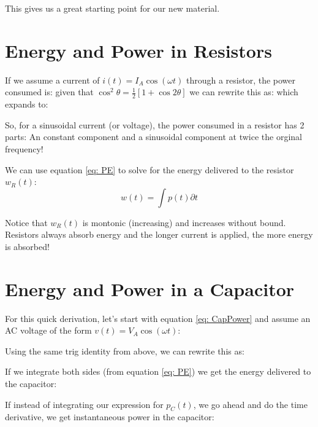 \documentclass{handout}
\begin{document}
This gives us a great starting point for our new material.

\section{Energy and Power in Resistors}
If we assume a current of $i(t)=I_A\cos(\omega t)$ through a resistor, the power consumed is:
\soln{0.75in}{
\[
p_R(t) = I_A^2R\cos^2(\omega t)
\]
}
given that $\cos^2\theta = \frac{1}{2}\left[ 1+\cos 2\theta \right]$ we can rewrite this as:
\soln{0.75in}{
\[
p_R(t) = \frac{I_A^2R}{2}\left[ 1+\cos(2\omega t)\right]
\]
}
which expands to:
\soln{0.75in}{
\[
p_R(t) = \frac{I_A^2R}{2}+\frac{I_A^2R}{2}\cos(2\omega t)
\]
}

So, for a sinusoidal current (or voltage), the power consumed in a resistor has 2 parts: An constant component and a sinusoidal component at twice the orginal frequency!

We can use equation \ref{eq: PE} to solve for the energy delivered to the resistor $w_R(t)$:
\[
w(t) = \int p(t) \partial t
\]

Notice that $w_R(t)$ is montonic (increasing) and increases without bound.  Resistors always absorb energy and the longer current is applied, the more energy is absorbed!

\newpage
\clearpage
\pagebreak

\section{Energy and Power in a Capacitor}
For this quick derivation, let's start with equation \ref{eq: CapPower} and assume an AC voltage of the form $v(t) = V_A\cos(\omega t)$:
\soln{1in}{
\[
p_C(t) = \frac{\partial }{\partial t}\left[ \frac{1}{2}CV_A^2\cos^2(\omega t) \right]
\]
}

Using the same trig identity from above, we can rewrite this as:

If we integrate both sides (from equation \ref{eq: PE}) we get the energy delivered to the capacitor:
\soln{1in}{
\[
w_C(t) = \frac{1}{4}CV_A^2\left[1+\cos(2\omega t)\right]
\]
}

If instead of integrating our expression for $p_C(t)$, we go ahead and do the time derivative, we get instantaneous power in the capacitor:
\soln{1in}{
\[
p_C(t) = -\frac{\omega CV_A^2}{2}\sin(2\omega t)
\]
}
\end{document}
